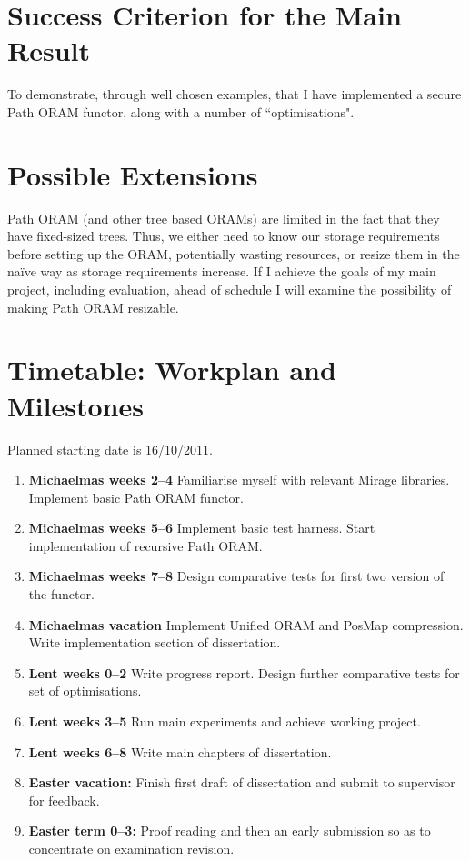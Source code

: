 \documentclass[12pt,a4paper,twoside]{article}
\begin{document}
\section*{Success Criterion for the Main Result}

To demonstrate, through well chosen examples, that I have implemented a secure Path ORAM functor, along with a number of ``optimisations".

\section*{Possible Extensions}

Path ORAM (and other tree based ORAMs) are limited in the fact that they have fixed-sized trees. Thus, we either need to know our storage requirements before setting up the ORAM, potentially wasting resources, or resize them in the na\"ive way as storage requirements increase. If I achieve the goals of my main project, including evaluation, ahead of schedule I will examine the possibility of making Path ORAM resizable.

\section*{Timetable: Workplan and Milestones}

Planned starting date is 16/10/2011.

\begin{enumerate}

\item {\bf Michaelmas weeks 2--4} Familiarise myself with relevant Mirage libraries. Implement basic Path ORAM functor.

\item {\bf Michaelmas weeks 5--6} Implement basic test harness. Start implementation of recursive Path ORAM.

\item {\bf Michaelmas weeks 7--8} Design comparative tests for first two version of the functor.

\item {\bf Michaelmas vacation} Implement Unified ORAM and PosMap compression. Write implementation section of dissertation. 

\item {\bf Lent weeks 0--2} Write progress report. Design further comparative tests for set of optimisations.

\item {\bf Lent weeks 3--5} Run main experiments and achieve working project.

\item {\bf Lent weeks 6--8} Write main chapters of dissertation.

\item {\bf Easter vacation:} Finish first draft of dissertation and submit to supervisor for feedback.

\item {\bf Easter term 0--3:} Proof reading and then an early submission
  so as to concentrate on examination revision.

\end{enumerate}
\end{document}
